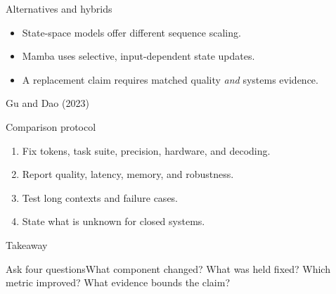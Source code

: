 \documentclass[aspectratio=169,10pt]{beamer}\usetheme{metropolis}
\begin{document}
\begin{frame}{Alternatives and hybrids}\begin{itemize}\item State-space models offer different sequence scaling.\item Mamba uses selective, input-dependent state updates.\item A replacement claim requires matched quality \emph{and} systems evidence.\end{itemize}\vfill\small Gu and Dao (2023)\end{frame}
\begin{frame}{Comparison protocol}\begin{enumerate}\item Fix tokens, task suite, precision, hardware, and decoding.\item Report quality, latency, memory, and robustness.\item Test long contexts and failure cases.\item State what is unknown for closed systems.\end{enumerate}\end{frame}
\begin{frame}{Takeaway}\begin{block}{Ask four questions}What component changed? What was held fixed? Which metric improved? What evidence bounds the claim?\end{block}\end{frame}
\end{document}
